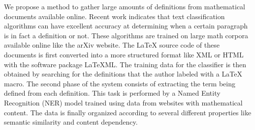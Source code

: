 We propose a method to gather large amounts of  definitions from  mathematical documents available online.
Recent work indicates that text classification algorithms can have excellent accuracy  at determining when a certain paragraph is in fact a definition or not. These algorithms are trained on large math corpora available online like the arXiv website. The \LaTeX{}    source code of these documents is first converted into a more structured format like XML or HTML with the software package LaTeXML. The training data for the classifier is then obtained by searching for the definitions that the author labeled with a \LaTeX{} macro. The second phase of the system consists of extracting the term being defined from each definition. This task is performed by a Named Entity Recognition (NER) model trained using data from websites with mathematical content. The data is finally organized according to several different properties like semantic similarity and content dependency. 
